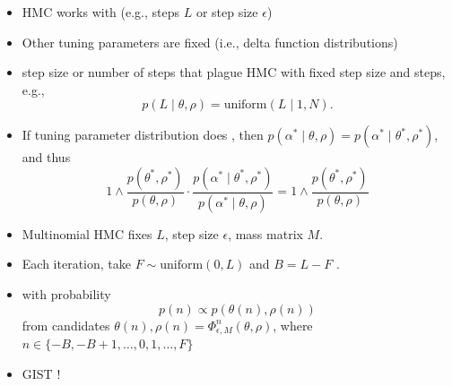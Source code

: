 \documentclass[10pt]{report}
\begin{document}
\begin{itemize}
\item HMC works with  (e.g., steps $L$ or
  step size $\epsilon$)
\item Other tuning parameters are fixed (i.e., delta function distributions)
\item {} step size or number of steps  that plague HMC with fixed step size and steps, e.g.,
  $$p(L \mid \theta, \rho) = \textrm{uniform}(L \mid 1, N).$$
\item If tuning parameter distribution does , then $p(\alpha^* \mid \theta, \rho) = p(\alpha^* \mid \theta^*,
  \rho^*)$, and thus
  $$
  1 \wedge
  \dfrac{p(\theta^*, \rho^*)}
       {p(\theta, \rho)}
  \cdot
  \dfrac{p(\alpha^* \mid \theta^*, \rho^*)}
       {p(\alpha^* \mid \theta, \rho)}
       =
       1 \wedge
       \dfrac{p(\theta^*, \rho^*)}{p(\theta, \rho)}
  $$       
\end{itemize}

\begin{itemize}
\item Multinomial HMC fixes  $L$, step size
  $\epsilon$, mass matrix $M$.
\item Each iteration, take $F \sim \textrm{uniform}(0, L)$  and $B = L - F$ .
  \item {} with probability
    $$p(n) \propto p(\theta(n), \rho(n))$$ from
    candidates  $\theta(n), \rho(n) = \Phi^n_{\epsilon,
      M}(\theta, \rho)$, where $n \in \{ -B, -B + 1, \ldots, 0, 1, \ldots, F \}$
\item GIST !
\end{itemize}
\end{document}
